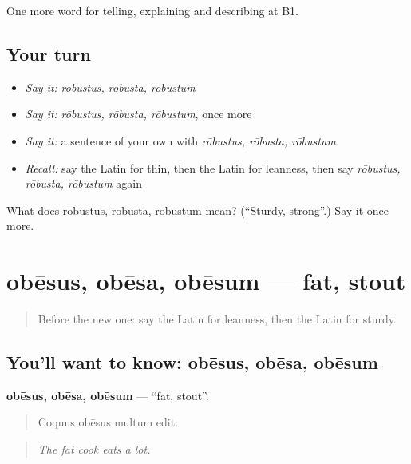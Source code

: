 \begin{grammarlens}[title={What you've built}]
One more word for telling, explaining and describing at B1.
\end{grammarlens}

\subsection*{Your turn}
\begin{itemize}
\raggedright
  \item \emph{Say it:} \emph{rōbustus, rōbusta, rōbustum}
  \item \emph{Say it:} \emph{rōbustus, rōbusta, rōbustum}, once more
  \item \emph{Say it:} a sentence of your own with \emph{rōbustus, rōbusta, rōbustum}
  \item \emph{Recall:} say the Latin for thin, then the Latin for leanness, then say \emph{rōbustus, rōbusta, rōbustum} again
\end{itemize}

\begin{tcolorbox}[breakable,colback=teal!4,colframe=teal!35!black,title={Before you move on}]
What does rōbustus, rōbusta, rōbustum mean? (\textquotedblleft{}Sturdy, strong\textquotedblright{}.) Say it once more.
\end{tcolorbox}
\section[obēsus, obēsa, obēsum]{obēsus, obēsa, obēsum — fat, stout}

\label{lesson:LA-C523-obesus}



\begin{quote}
Before the new one: say the Latin for leanness, then the Latin for sturdy.
\end{quote}

\subsection*{You'll want to know: obēsus, obēsa, obēsum}
\textbf{obēsus, obēsa, obēsum} — \textquotedblleft{}fat, stout\textquotedblright{}.

\begin{quote}
Coquus obēsus multum edit.
\end{quote}

\begin{quote}
\emph{The fat cook eats a lot.}
\end{quote}

